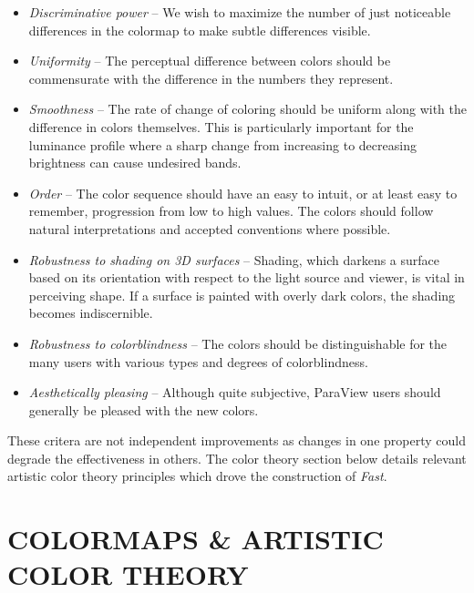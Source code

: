 \documentclass{IEEEcsmag}
\newcommand*{\colormap}[1]{\textsl{#1}\xspace}
\newcommand*{\fast}{\colormap{Fast}}
\begin{document}
\begin{itemize}

\item \emph{Discriminative power} --
  We wish to maximize the number of just noticeable differences in the colormap to make subtle differences visible.
\item \emph{Uniformity} --
  The perceptual difference between colors should be commensurate with the difference in the numbers they represent.
\item \emph{Smoothness} --
  The rate of change of coloring should be uniform along with the difference in colors themselves.
  This is particularly important for the luminance profile where a sharp change from increasing to decreasing brightness can cause undesired bands.
\item \emph{Order} --
  The color sequence should have an easy to intuit, or at least easy to remember, progression from low to high values.
  The colors should follow natural interpretations and accepted conventions where possible.
\item \emph{Robustness to shading on 3D surfaces} -- Shading, which darkens a surface based on its orientation with respect to the light source and viewer, is vital in perceiving shape.
  If a surface is painted with overly dark colors, the shading becomes indiscernible.
\item \emph{Robustness to colorblindness} --
  The colors should be distinguishable for the many users with various types and degrees of colorblindness.
\item \emph{Aesthetically pleasing} --
  Although quite subjective, ParaView users should generally be pleased with the new colors.

\end{itemize}
These critera are not independent improvements as changes in one property could degrade the effectiveness in others.
The color theory section below details relevant artistic color theory principles which drove the construction of \fast.



\section {COLORMAPS \& ARTISTIC COLOR THEORY}
\end{document}

